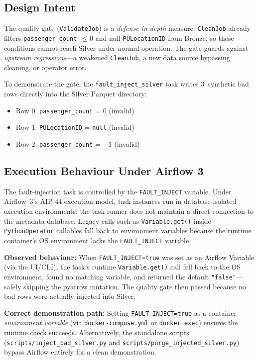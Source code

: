 \documentclass{article}
\begin{document}
\subsection{Design Intent}

The quality gate (\texttt{ValidateJob}) is a \emph{defense-in-depth} measure: \texttt{CleanJob} already filters \texttt{passenger\_count}~$\le 0$ and null \texttt{PULocationID} from Bronze, so these conditions cannot reach Silver under normal operation. The gate guards against \emph{upstream regressions}—a weakened \texttt{CleanJob}, a new data source bypassing cleaning, or operator error.

To demonstrate the gate, the \texttt{fault\_inject\_silver} task writes 3~synthetic bad rows directly into the Silver Parquet directory:
\begin{itemize}[nosep]
    \item Row 0: \texttt{passenger\_count} = 0 (invalid)
    \item Row 1: \texttt{PULocationID} = \texttt{null} (invalid)
    \item Row 2: \texttt{passenger\_count} = $-1$ (invalid)
\end{itemize}

\subsection{Execution Behaviour Under Airflow 3}

The fault-injection task is controlled by the \texttt{FAULT\_INJECT} variable. Under Airflow~3's AIP-44 execution model, task instances run in database-isolated execution environments: the task runner does not maintain a direct connection to the metadata database. Legacy calls such as \texttt{Variable.get()} inside \texttt{PythonOperator} callables fall back to environment variables because the runtime container's OS environment lacks the \texttt{FAULT\_INJECT} variable.

\textbf{Observed behaviour:} When \texttt{FAULT\_INJECT=true} was set as an Airflow Variable (via the UI/CLI), the task's runtime \texttt{Variable.get()} call fell back to the OS environment, found no matching variable, and returned the default \texttt{"false"}—safely skipping the pyarrow mutation. The quality gate then passed because no bad rows were actually injected into Silver.

\textbf{Correct demonstration path:} Setting \texttt{FAULT\_INJECT=true} as a container \emph{environment variable} (via \texttt{docker-compose.yml} or \texttt{docker exec}) ensures the runtime check succeeds. Alternatively, the standalone scripts (\texttt{scripts/inject\_bad\_silver.py} and \texttt{scripts/purge\_injected\_silver.py}) bypass Airflow entirely for a clean demonstration.
\end{document}
